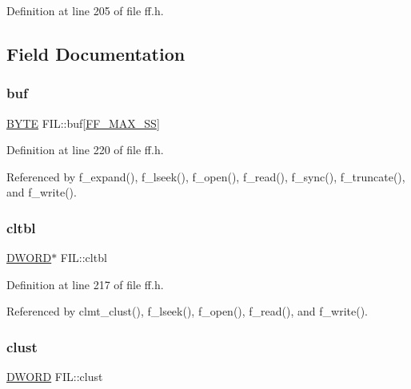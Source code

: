 Definition at line 205 of file ff.\+h.



\subsection{Field Documentation}
\mbox{\label{structFIL_ac2aa36f0fa61cd82f905173d51f719b0}} 
\subsubsection{\texorpdfstring{buf}{buf}}
{\footnotesize\ttfamily \hyperlink{ff_8h_a4ae1dab0fb4b072a66584546209e7d58}{B\+Y\+TE} F\+I\+L\+::buf\mbox{[}\hyperlink{ffconf_8h_a104c36ee46f9d6e76dadf37f3d9696cc}{F\+F\+\_\+\+M\+A\+X\+\_\+\+SS}\mbox{]}}



Definition at line 220 of file ff.\+h.



Referenced by f\+\_\+expand(), f\+\_\+lseek(), f\+\_\+open(), f\+\_\+read(), f\+\_\+sync(), f\+\_\+truncate(), and f\+\_\+write().

\mbox{\label{structFIL_a28a30613d48cefcf9efbd334cd861fc8}} 
\subsubsection{\texorpdfstring{cltbl}{cltbl}}
{\footnotesize\ttfamily \hyperlink{ff_8h_ad342ac907eb044443153a22f964bf0af}{D\+W\+O\+RD}$\ast$ F\+I\+L\+::cltbl}



Definition at line 217 of file ff.\+h.



Referenced by clmt\+\_\+clust(), f\+\_\+lseek(), f\+\_\+open(), f\+\_\+read(), and f\+\_\+write().

\mbox{\label{structFIL_aa41312aba551b9a6d1c9d3c8c7d2734b}} 
\subsubsection{\texorpdfstring{clust}{clust}}
{\footnotesize\ttfamily \hyperlink{ff_8h_ad342ac907eb044443153a22f964bf0af}{D\+W\+O\+RD} F\+I\+L\+::clust}



